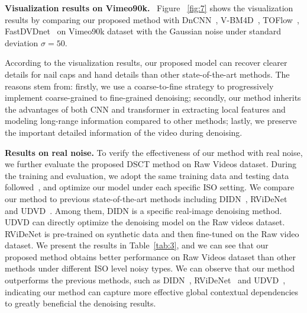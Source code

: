 \documentclass[journal]{IEEEtran}
\begin{document}


\textbf{Visualization results on Vimeo90k.}~ 
Figure ~\ref{fig:7}
shows the visualization results by comparing our proposed method with DnCNN~\cite{Zhang2017BeyondAG}, V-BM4D~\cite{Maggioni2012VideoDD}, TOFlow~\cite{xue2019video}, FastDVDnet~\cite{Tassano2020FastDVDnetTR} on Vimeo90k dataset with the Gaussian noise under standard deviation $\sigma=50$.

According to the visualization results, our proposed model can recover clearer details for nail caps and hand details than other state-of-the-art methods. The reasons stem from: firstly, we use a coarse-to-fine strategy to progressively implement coarse-grained to fine-grained denoising; secondly, our method inherits the advantages of both CNN and transformer in extracting local features and modeling long-range information compared to other methods; lastly, we preserve the important detailed information of the video during denoising.


\noindent
\textbf{Results on real noise.} 
To verify the effectiveness of our method with real noise, we further evaluate the proposed DSCT method on Raw Videos dataset. During the training and evaluation, we adopt the same training data and testing data followed~\cite{Sheth_2021_ICCV}, and optimize our model under each specific ISO setting. We compare our method to previous state-of-the-art methods including DIDN~\cite{9025411}, RViDeNet\cite{Yue_2020_CVPR} and UDVD~\cite{Sheth_2021_ICCV}. Among them, DIDN is a specific real-image denoising method. UDVD can directly optimize the denoising model on the Raw videos dataset. RViDeNet is pre-trained on synthetic data and then fine-tuned on the Raw video dataset. 
We present the results in Table~\ref{tab:3}, and we can see that our proposed method obtains better performance on Raw Videos dataset than other methods under different ISO level noisy types.
We can observe that our method outperforms the previous methods, such as DIDN~\cite{9025411}, RViDeNet~\cite{Yue_2020_CVPR} and UDVD~\cite{Sheth_2021_ICCV}, indicating our method can capture more effective global contextual dependencies to greatly beneficial the denoising results.
\end{document}
